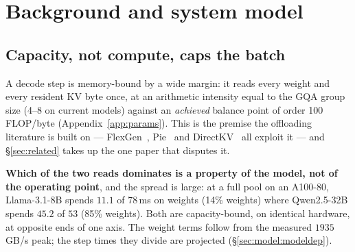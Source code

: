 %
%

\section{Background and system model}
\label{sec:background}

\subsection{Capacity, not compute, caps the batch}
\label{sec:background:capacity}

A decode step is memory-bound by a wide margin: it reads every weight and every
resident KV byte once, at an arithmetic intensity equal to the GQA group size (4--8
on current models) against an \emph{achieved} balance point of order 100 FLOP/byte
(Appendix~\ref{app:params}). This is the premise the offloading literature is built
on --- FlexGen~\cite{flexgen}, Pie~\cite{pie} and DirectKV~\cite{directkv} all
exploit it --- and \S\ref{sec:related} takes up the one paper that disputes it.

\textbf{Which of the two reads dominates is a property of the model, not of the
operating point}, and the spread is large: at a full pool on an A100-80,
Llama-3.1-8B spends $11.1$ of $78$\,ms on weights (14\% weights) where
Qwen2.5-32B spends $45.2$ of $53$ (85\% weights). Both are capacity-bound, on
identical hardware, at opposite ends of one axis. The weight terms follow from the
measured $1935$\,GB/s peak; the step times they divide are projected
(\S\ref{sec:model:modeldep}).

